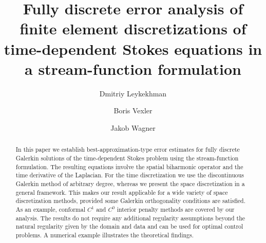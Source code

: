 \documentclass{m2an}
\newcommand{\1}{\mathds{1}}
\theoremstyle{definition}
\begin{document}
\title{Fully discrete error analysis of finite element discretizations of time-dependent
        Stokes equations in a stream-function formulation}

\author{Dmitriy Leykekhman}\address{Department of Mathematics,
               University of Connecticut,
              Storrs,
            CT~06269, USA (). }
\author{Boris Vexler}\address{Chair of Optimal Control, Department for Mathematics, School of Computation, Information and Technology, Technical University of Munich, Boltzmannstra{\ss}e 3, 85748 Garching b. Munich, Germany
(). }
\author{Jakob Wagner}

\begin{abstract}
In this paper we establish best-approximation-type error estimates for fully discrete Galerkin solutions of 
the time-dependent Stokes problem
using the stream-function formulation. The resulting equations involve the spatial biharmonic operator and the time derivative of the Laplacian.
For the time discretization we use the discontinuous Galerkin method
of arbitrary degree,
whereas we  present the space discretization in a general framework. This makes our result applicable for a wide variety of space discretization methods, provided some Galerkin orthogonality conditions are satisfied.
As an example, conformal $C^1$ and $C^0$  interior penalty methods are covered by our analysis. The results do not require any additional regularity assumptions beyond the natural regularity given by the domain and data and can be used for optimal control problems. A numerical example illustrates the theoretical findings. 
\end{abstract}



\maketitle
\end{document}
